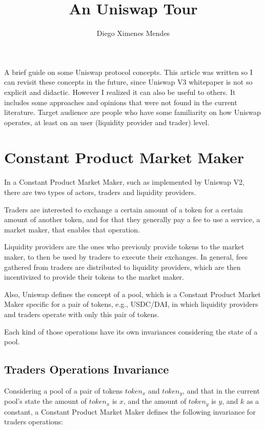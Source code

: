 \documentclass{article}
\title{An Uniswap Tour}
\author{Diego Ximenes Mendes}
\begin{document}
\date{}
\maketitle

A brief guide on some Uniswap protocol concepts.
This article was written so I can revisit these concepts in the future, since Uniswap V3 whitepaper is not so explicit and didactic.
However I realized it can also be useful to others.
It includes some approaches and opinions that were not found in the current literature.
Target audience are people who have some familiarity on how Uniswap operates, at least on an user (liquidity provider and trader) level.

\section{Constant Product Market Maker}

In a Constant Product Market Maker, such as implemented by Uniswap V2, there are two types of actors, traders and liquidity providers.

Traders are interested to exchange a certain amount of a token for a certain amount of another token, and for that they generally pay a fee to use a service, a market maker, that enables that operation.

Liquidity providers are the ones who previouly provide tokens to the market maker, to then be used by traders to execute their exchanges.
In general, fees gathered from traders are distributed to liquidity providers, which are then incentivized to provide their tokens to the market maker.

Also, Uniswap defines the concept of a pool, which is a Constant Product Market Maker specific for a pair of tokens, e.g., USDC/DAI, in which liquidity providers and traders operate with only this pair of tokens.

Each kind of those operations have its own invariances considering the state of a pool.

\subsection{Traders Operations Invariance}
\label{section:traders_invariance}

Considering a pool of a pair of tokens $token_x$ and $token_y$, and that in the current pool's state the amount of $token_x$ is $x$, and the amount of $token_y$ is $y$, and $k$ as a constant, a Constant Product Market Maker defines the following invariance for traders operations:
\end{document}
